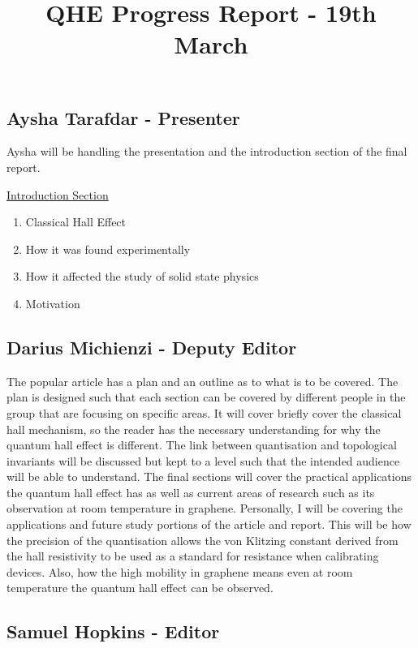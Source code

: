 \documentclass[notitlepage, a4paper, prl, aps]{revtex4}
\begin{document}
\title{QHE Progress Report - 19th March}

\author{}

\maketitle

\subsection*{Aysha Tarafdar - Presenter}
Aysha will be handling the presentation and the introduction section of the final report. 

\underline{Introduction Section}
\begin{enumerate}
    \item Classical Hall Effect
    \item How it was found experimentally
    \item How it affected the study of solid state physics
    \item Motivation
\end{enumerate}

\subsection*{Darius Michienzi - Deputy Editor}
The popular article has a plan and an outline as to what is to be covered. The plan is designed such that each section can be covered by different people in the 
group that are focusing on specific areas. It will cover briefly cover the classical hall mechanism, so the reader has the necessary understanding for why the 
quantum hall effect is different. The link between quantisation and topological invariants will be discussed but kept to a level such that the intended audience 
will be able to understand. The final sections will cover the practical applications the quantum hall effect has as well as current areas of research such as its 
observation at room temperature in graphene.  
\newline
Personally, I will be covering the applications and future study portions of the article and report. This will be how the precision of the quantisation allows the
 von Klitzing constant derived from the hall resistivity to be used as a standard for resistance when calibrating devices. Also, how the high mobility in graphene 
 means even at room temperature the quantum hall effect can be observed.   

\subsection*{Samuel Hopkins - Editor}
\end{document}
